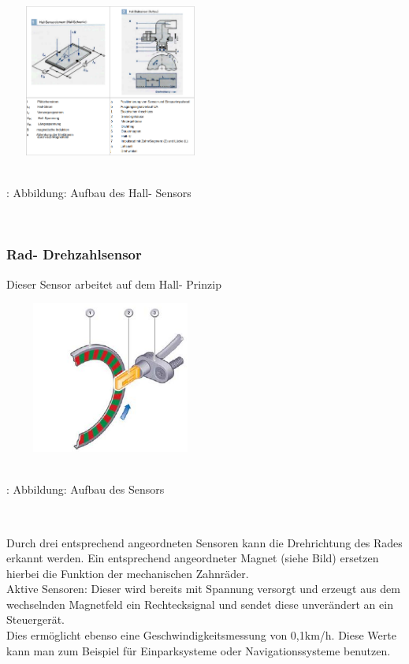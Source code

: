 \documentclass{article}
\begin{document}
				\begin{center}
					\includegraphics[width=7cm, height=5cm] {Images/Kapitel5/hall.png}
					\caption {\\\cite{TS25}: Abbildung: Aufbau des Hall- Sensors}
				\end{center}\\
			
			
			\subsubsection{Rad- Drehzahlsensor}
			
				Dieser Sensor arbeitet auf dem Hall- Prinzip
				\begin{center}
					\includegraphics[width=7cm, height=5cm] {Images/Kapitel5/radsensor.png}
					\caption {\\\cite{TS26}: Abbildung: Aufbau des Sensors}
				\end{center}\\
			
				\begin{flushleft}
					Durch drei entsprechend angeordneten Sensoren kann die Drehrichtung des Rades erkannt werden. Ein entsprechend angeordneter Magnet (siehe Bild) ersetzen hierbei die Funktion der mechanischen Zahnräder.\\
					Aktive Sensoren: Dieser wird bereits mit Spannung versorgt und erzeugt aus dem wechselnden Magnetfeld ein Rechtecksignal und sendet diese unverändert an ein Steuergerät.\\
					Dies ermöglicht ebenso eine Geschwindigkeitsmessung von 0,1km/h. Diese Werte kann man zum Beispiel für Einparksysteme oder Navigationssysteme benutzen.\cite{TS27}
					
				\end{flushleft}
\end{document}
